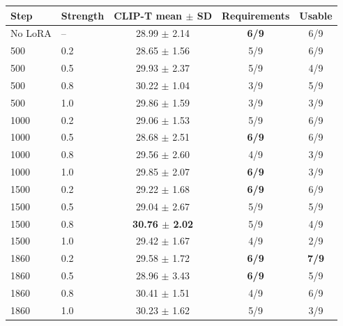 \begin{tabular}{llccc}
\hline
Step & Strength & CLIP-T mean $\pm$ SD & Requirements & Usable \\
\hline
No LoRA & -- & 28.99 $\pm$ 2.14 & \textbf{6/9} & 6/9 \\
500 & 0.2 & 28.65 $\pm$ 1.56 & 5/9 & 6/9 \\
500 & 0.5 & 29.93 $\pm$ 2.37 & 5/9 & 4/9 \\
500 & 0.8 & 30.22 $\pm$ 1.04 & 3/9 & 5/9 \\
500 & 1.0 & 29.86 $\pm$ 1.59 & 3/9 & 3/9 \\
1000 & 0.2 & 29.06 $\pm$ 1.53 & 5/9 & 6/9 \\
1000 & 0.5 & 28.68 $\pm$ 2.51 & \textbf{6/9} & 6/9 \\
1000 & 0.8 & 29.56 $\pm$ 2.60 & 4/9 & 3/9 \\
1000 & 1.0 & 29.85 $\pm$ 2.07 & \textbf{6/9} & 3/9 \\
1500 & 0.2 & 29.22 $\pm$ 1.68 & \textbf{6/9} & 6/9 \\
1500 & 0.5 & 29.04 $\pm$ 2.67 & 5/9 & 5/9 \\
1500 & 0.8 & \textbf{30.76 $\pm$ 2.02} & 5/9 & 4/9 \\
1500 & 1.0 & 29.42 $\pm$ 1.67 & 4/9 & 2/9 \\
1860 & 0.2 & 29.58 $\pm$ 1.72 & \textbf{6/9} & \textbf{7/9} \\
1860 & 0.5 & 28.96 $\pm$ 3.43 & \textbf{6/9} & 5/9 \\
1860 & 0.8 & 30.41 $\pm$ 1.51 & 4/9 & 6/9 \\
1860 & 1.0 & 30.23 $\pm$ 1.62 & 5/9 & 3/9 \\
\hline
\end{tabular}
